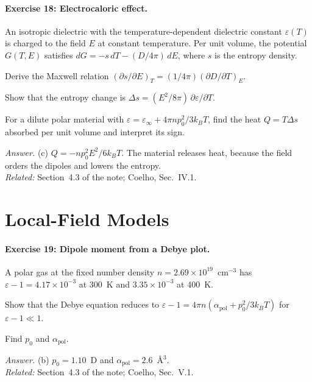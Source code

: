 \documentclass[11pt]{article}      %
\numberwithin{equation}{section}   %
\begin{document}
\paragraph{Exercise 18: Electrocaloric effect.}
An isotropic dielectric with the temperature-dependent dielectric constant $\varepsilon(T)$ is charged to the field $E$ at constant temperature. Per unit volume, the potential $G(T, E)$ satisfies $dG = -s\,dT - (D/4\pi)\,dE$, where $s$ is the entropy density.
\begin{parts}
    \item Derive the Maxwell relation $(\partial s/\partial E)_T = (1/4\pi)(\partial D/\partial T)_E$.
    \item Show that the entropy change is $\Delta s = (E^2/8\pi)\,\partial\varepsilon/\partial T$.
    \item For a dilute polar material with $\varepsilon = \varepsilon_\infty + 4\pi np_0^2/3k_BT$, find the heat $Q = T\Delta s$ absorbed per unit volume and interpret its sign.
\end{parts}
\textit{Answer.} (c) $Q = -np_0^2E^2/6k_BT$. The material releases heat, because the field orders the dipoles and lowers the entropy.\\
\textit{Related:} Section~4.3 of the note; Coelho, Sec.~IV.1.

\section{Local-Field Models}

\paragraph{Exercise 19: Dipole moment from a Debye plot.}
A polar gas at the fixed number density $n = 2.69\times10^{19}$~cm$^{-3}$ has $\varepsilon - 1 = 4.17\times10^{-3}$ at 300~K and $3.35\times10^{-3}$ at 400~K.
\begin{parts}
    \item Show that the Debye equation reduces to $\varepsilon - 1 = 4\pi n\left(\alpha_{\text{pol}} + p_0^2/3k_BT\right)$ for $\varepsilon - 1 \ll 1$.
    \item Find $p_0$ and $\alpha_{\text{pol}}$.
\end{parts}
\textit{Answer.} (b) $p_0 = 1.10$~D and $\alpha_{\text{pol}} = 2.6$~\AA$^3$.\\
\textit{Related:} Section~4.3 of the note; Coelho, Sec.~V.1.
\end{document}
